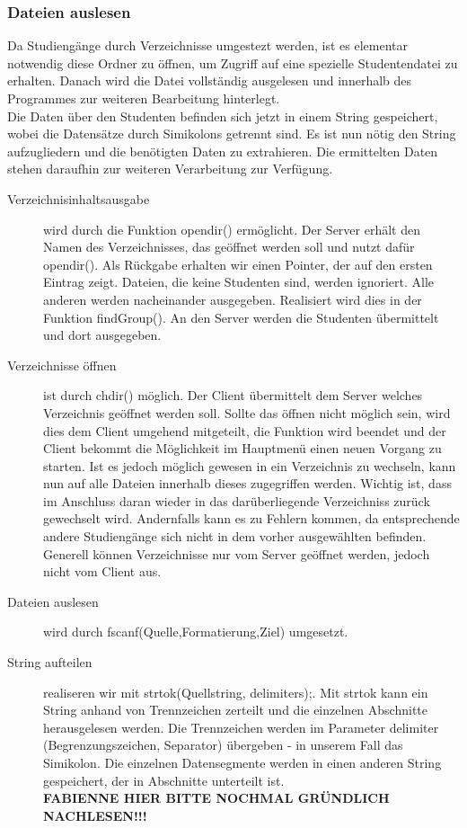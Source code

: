 \documentclass{scrartcl}
\begin{document}
		\subsubsection{Dateien auslesen}
			Da Studiengänge durch Verzeichnisse umgestezt werden, ist es elementar notwendig diese Ordner zu öffnen, um Zugriff auf eine spezielle Studentendatei zu erhalten. Danach wird die Datei vollständig ausgelesen und innerhalb des Programmes zur weiteren Bearbeitung hinterlegt.\\
			Die Daten über den Studenten befinden sich jetzt in einem String gespeichert, wobei die Datensätze durch Simikolons getrennt sind. Es ist nun nötig den String aufzugliedern und die benötigten Daten zu extrahieren. Die ermittelten Daten stehen daraufhin zur weiteren Verarbeitung zur Verfügung.
			\begin{description}
				\item[Verzeichnisinhaltsausgabe] wird durch die Funktion opendir() ermöglicht. Der Server erhält den Namen des Verzeichnisses, das geöffnet werden soll und nutzt dafür opendir(). Als Rückgabe erhalten wir einen Pointer, der auf den ersten Eintrag zeigt. Dateien, die keine Studenten sind, werden ignoriert. Alle anderen werden nacheinander ausgegeben. Realisiert wird dies in der Funktion findGroup(). An den Server werden die Studenten übermittelt und dort ausgegeben.
				\item[Verzeichnisse öffnen] ist durch chdir() möglich. Der Client übermittelt dem Server welches Verzeichnis geöffnet werden soll. Sollte das öffnen nicht möglich sein, wird dies dem Client umgehend mitgeteilt, die Funktion wird beendet und der Client bekommt die Möglichkeit im Hauptmenü einen neuen Vorgang zu starten. Ist es jedoch möglich gewesen in ein Verzeichnis zu wechseln, kann nun auf alle Dateien innerhalb dieses zugegriffen werden. Wichtig ist, dass im Anschluss daran wieder in das darüberliegende Verzeichniss zurück gewechselt wird. Andernfalls kann es zu Fehlern kommen, da entsprechende andere Studiengänge sich nicht in dem vorher ausgewählten befinden.\\
				Generell können Verzeichnisse nur vom Server geöffnet werden, jedoch nicht vom Client aus.
				\item[Dateien auslesen] wird durch fscanf(Quelle,Formatierung,Ziel) umgesetzt.
				\item[String aufteilen] realiseren wir mit  strtok(Quellstring, delimiters);. Mit strtok kann ein String anhand von Trennzeichen zerteilt und die einzelnen Abschnitte herausgelesen werden. Die Trennzeichen werden im Parameter delimiter (Begrenzungszeichen, Separator) übergeben - in unserem Fall das Simikolon. Die einzelnen Datensegmente werden in einen anderen String gespeichert, der in Abschnitte unterteilt ist. \\
				\textbf{FABIENNE HIER BITTE NOCHMAL GRÜNDLICH NACHLESEN!!!}
			\end{description}
\end{document}
